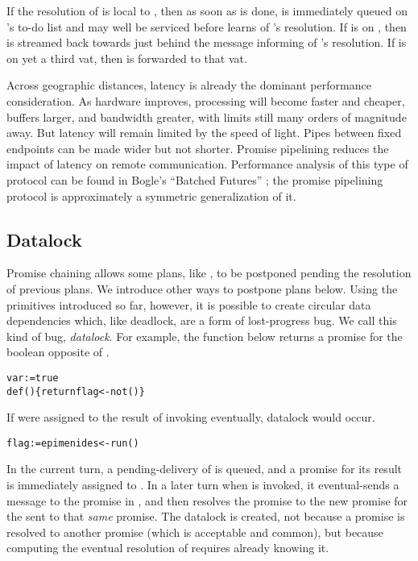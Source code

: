 \documentclass{llncs}
\begin{document}
If the resolution of  is local to , then as soon as
 is done,  is immediately queued on 's
to-do list and may well be serviced before  learns of
's resolution. If  is on , then  is
streamed back towards  just behind the message informing
 of 's resolution.  If  is on yet a third vat,
then  is forwarded to that vat.

Across geographic distances, latency is already the dominant
performance consideration. As hardware improves, processing will
become faster and cheaper, buffers larger, and bandwidth greater, with
limits still many orders of magnitude away. But latency will remain
limited by the speed of light. Pipes between fixed endpoints can be
made wider but not shorter. Promise pipelining reduces the impact of
latency on remote communication. Performance analysis of this type of
protocol can be found in Bogle's ``Batched Futures''
\cite{bogle:batched}; the promise pipelining protocol is approximately
a symmetric generalization of it.

\subsection{Datalock}

Promise chaining allows some plans, like , to be postponed
pending the resolution of previous plans. We introduce other ways to
postpone plans below.  Using the primitives introduced so far,
however, it is possible to create circular data dependencies which,
like deadlock, are a form of lost-progress bug. We call this kind of
bug, \emph{datalock}.  For example, the  function below
returns a promise for the boolean opposite of .
%
\begin{alltt}
    var  := true
    def () \{ return flag <- not() \}
\end{alltt}
%
If  were assigned to the result of invoking
 eventually, datalock would occur.
%
\begin{alltt}
    flag := epimenides <- run()
\end{alltt}
%
In the current turn, a pending-delivery of 
is queued, and a promise for its result is immediately assigned to
.  In a later turn when  is invoked, it
eventual-sends a message to the promise in , and then
resolves the  promise to the new promise for the
 sent to that \emph{same}  promise.  The datalock is
created, not because a promise is resolved to another promise (which
is acceptable and common), but because computing the eventual
resolution of  requires already knowing it.
\end{document}

